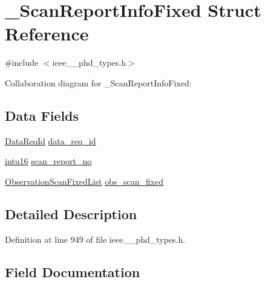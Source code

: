 \hypertarget{struct___scan_report_info_fixed}{}\section{\+\_\+\+Scan\+Report\+Info\+Fixed Struct Reference}
\label{struct___scan_report_info_fixed}


{\ttfamily \#include $<$ieee\+\_\+\_\+phd\+\_\+types.\+h$>$}



Collaboration diagram for \+\_\+\+Scan\+Report\+Info\+Fixed\+:
\subsection*{Data Fields}
\begin{DoxyCompactItemize}
\item 
\hyperlink{ieee__11073__phd__types_8h_ab2d118926c6a08395e5d075382450ae0}{Data\+Req\+Id} \hyperlink{struct___scan_report_info_fixed_a1c786af4096ed61c5f6cfdf27f317b70}{data\+\_\+req\+\_\+id}
\item 
\hyperlink{ieee__11073__phd__types_8h_a3561595d2aa7416532e1c9910abd076d}{intu16} \hyperlink{struct___scan_report_info_fixed_a21f75132869d4d200ffe01d91b4736d8}{scan\+\_\+report\+\_\+no}
\item 
\hyperlink{ieee__11073__phd__types_8h_a518767d4e8848833516b3920e33c8e1f}{Observation\+Scan\+Fixed\+List} \hyperlink{struct___scan_report_info_fixed_a7bf9f6540d9ed76586557937ba083637}{obs\+\_\+scan\+\_\+fixed}
\end{DoxyCompactItemize}


\subsection{Detailed Description}


Definition at line 949 of file ieee\+\_\+\_\+phd\+\_\+types.\+h.



\subsection{Field Documentation}
\hypertarget{struct___scan_report_info_fixed_a1c786af4096ed61c5f6cfdf27f317b70}{}
